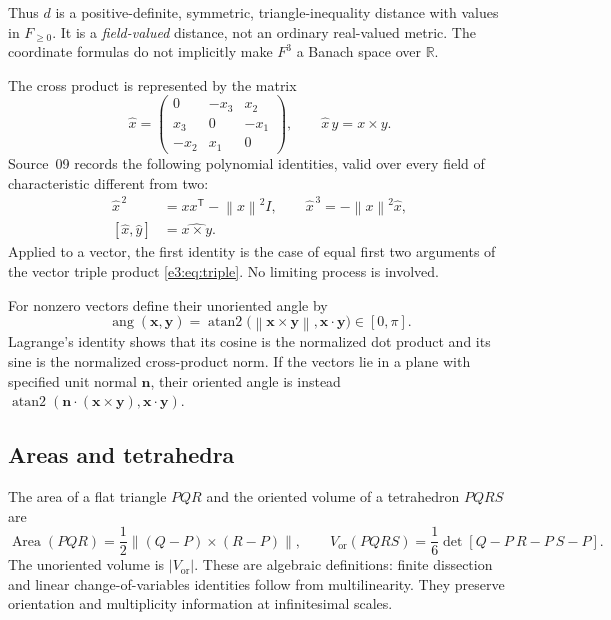 \documentclass[11pt,letterpaper]{article}
\numberwithin{equation}{section}
\theoremstyle{definition}
\theoremstyle{remark}
\newcommand{\R}{\mathbb R}
\newcommand{\atantwo}{\operatorname{atan2}}
\newcommand{\area}{\operatorname{Area}}
\newcommand{\norm}[1]{\left\lVert#1\right\rVert}
\newcommand{\vv}[1]{\bm{#1}}
\newcommand{\transpose}{^{\mathsf T}}
\newcommand{\ang}{\operatorname{ang}}
\begin{document}
Thus $d$ is a positive-definite, symmetric, triangle-inequality distance with
values in $F_{\ge0}$. It is a \emph{field-valued} distance, not an ordinary
real-valued metric. The coordinate formulas do not implicitly make $F^3$ a
Banach space over $\R$.

The cross product is represented by the matrix
\begin{equation}\label{e3:so:eq:hat}
 \widehat{x}=
 \begin{pmatrix}0&-x_3&x_2\\x_3&0&-x_1\\-x_2&x_1&0\end{pmatrix},
 \qquad \widehat{x}\,y=x\times y .
\end{equation}
Source~09 records the following polynomial identities, valid over every field
of characteristic different from two:
\begin{align}
 \widehat{x}^{\,2}&=xx\transpose-\norm{x}^2I,\qquad
 \widehat{x}^{\,3}=-\norm{x}^2\widehat{x},\label{e3:so:eq:hatpowers}\\
 [\widehat{x},\widehat{y}]&=\widehat{x\times y}.\label{e3:so:eq:hatbracket}
\end{align}
Applied to a vector, the first identity is the case of equal first two
arguments of the vector triple product \cref{e3:eq:triple}. No limiting process
is involved.

For nonzero vectors define their unoriented angle by
\begin{equation}\label{e3:eq:vectorangle}
 \ang(\vv x,\vv y)=
 \atantwo\bigl(\norm{\vv x\times\vv y},\vv x\cdot\vv y\bigr)
 \in[0,\pi].
\end{equation}
Lagrange's identity shows that its cosine is the normalized dot product and
its sine is the normalized cross-product norm. If the vectors lie in a plane
with specified unit normal $\vv n$, their oriented angle is instead
$\atantwo(\vv n\cdot(\vv x\times\vv y),\vv x\cdot\vv y)$.

\subsection{Areas and tetrahedra}

The area of a flat triangle $PQR$ and the oriented volume of a tetrahedron
$PQRS$ are
\begin{equation}\label{e3:eq:flatvol}
 \area(PQR)=\frac12\norm{(Q-P)\times(R-P)},\qquad
 V_{\mathrm{or}}(PQRS)=\frac16\det[Q-P\ R-P\ S-P].
\end{equation}
The unoriented volume is $|V_{\mathrm{or}}|$. These are algebraic definitions:
finite dissection and linear change-of-variables identities follow from
multilinearity. They preserve orientation and multiplicity information at
infinitesimal scales.
\end{document}
